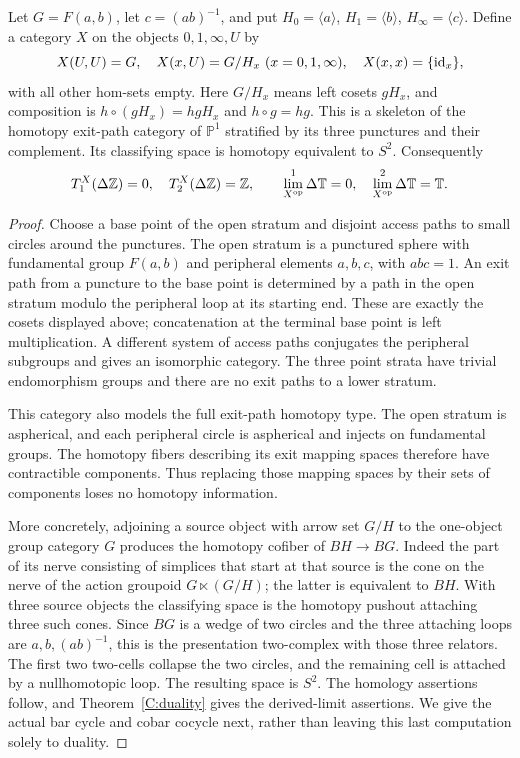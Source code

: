 \begin{theorem}\label{C:exit}
Let $G=F(a,b)$, let $c=(ab)^{-1}$, and put $H_0=\langle a\rangle$, $H_1=\langle b\rangle$, $H_\infty=\langle c\rangle$. Define a category $X$ on the objects $0,1,\infty,U$ by
\[
 X(U,U)=G,\quad X(x,U)=G/H_x\ (x=0,1,\infty),\quad
 X(x,x)=\{\id_x\},
\]
with all other hom-sets empty. Here $G/H_x$ means left cosets $gH_x$, and composition is $h\circ(gH_x)=hgH_x$ and $h\circ g=hg$. This is a skeleton of the homotopy exit-path category of $\mathbb P^1$ stratified by its three punctures and their complement. Its classifying space is homotopy equivalent to $S^2$. Consequently
\[
 T_1^X(\Delta\mathbb Z)=0,\quad T_2^X(\Delta\mathbb Z)=\mathbb Z,
 \qquad \lim^1_{X^{\mathrm{op}}}\Delta\mathbb T=0,\quad
 \lim^2_{X^{\mathrm{op}}}\Delta\mathbb T=\mathbb T.
\]
\end{theorem}
\begin{proof}
Choose a base point of the open stratum and disjoint access paths to small circles around the punctures. The open stratum is a punctured sphere with fundamental group $F(a,b)$ and peripheral elements $a,b,c$, with $abc=1$. An exit path from a puncture to the base point is determined by a path in the open stratum modulo the peripheral loop at its starting end. These are exactly the cosets displayed above; concatenation at the terminal base point is left multiplication. A different system of access paths conjugates the peripheral subgroups and gives an isomorphic category. The three point strata have trivial endomorphism groups and there are no exit paths to a lower stratum.

This category also models the full exit-path homotopy type. The open stratum is aspherical, and each peripheral circle is aspherical and injects on fundamental groups. The homotopy fibers describing its exit mapping spaces therefore have contractible components. Thus replacing those mapping spaces by their sets of components loses no homotopy information.

More concretely, adjoining a source object with arrow set $G/H$ to the one-object group category $G$ produces the homotopy cofiber of $BH\to BG$. Indeed the part of its nerve consisting of simplices that start at that source is the cone on the nerve of the action groupoid $G\ltimes(G/H)$; the latter is equivalent to $BH$. With three source objects the classifying space is the homotopy pushout attaching three such cones. Since $BG$ is a wedge of two circles and the three attaching loops are $a,b,(ab)^{-1}$, this is the presentation two-complex with those three relators. The first two two-cells collapse the two circles, and the remaining cell is attached by a nullhomotopic loop. The resulting space is $S^2$. The homology assertions follow, and Theorem~\ref{C:duality} gives the derived-limit assertions. We give the actual bar cycle and cobar cocycle next, rather than leaving this last computation solely to duality.
\end{proof}

